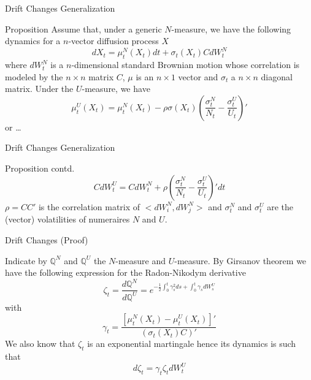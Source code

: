 \documentclass{beamer}
\begin{document}
\begin{frame}{Drift Changes Generalization}
  \begin{block}{Proposition}
    Assume that, under a generic $N$-measure, we have the following dynamics for a $n$-vector diffusion process $X$
    \begin{equation*}
      dX_t = \mu_t^N(X_t)dt + \sigma_t(X_t)CdW^N_t
    \end{equation*}
    where $dW^N_t$ is a $n$-dimensional standard Brownian motion whose correlation is modeled by the $n\times n$ matrix $C$, $\mu$ is an $n\times 1$ vector and $\sigma_t$ a $n\times n$ diagonal matrix. Under the $U$-measure, we have
    \begin{equation}
      \mu^U_t(X_t) = \mu^N_t(X_t) - \rho\sigma(X_t)\left(\frac{\sigma^N_t}{N_t}-\frac{\sigma^U_t}{U_t}\right)'
    \end{equation}
	or \ldots
	\end{block}
\end{frame}

\begin{frame}{Drift Changes Generalization}
	\begin{block}{Proposition contd.}
		\begin{equation}
			CdW^U_t = CdW^N_t + \rho\left(\frac{\sigma^N_t}{N_t}-\frac{\sigma^U_t}{U_t}\right)' dt
		\end{equation}
		$\rho=CC'$ is the correlation matrix of $<dW^N_i,dW^N_j>$ and $\sigma^N_t$ and $\sigma^U_t$ are the (vector) volatilities of numeraires $N$ and $U$. %
	\end{block}
\end{frame}

\begin{frame}{Drift Changes (Proof)}
  
  Indicate by $\mathbb{Q}^N$ and $\mathbb{Q}^U$ the $N$-measure and $U$-measure. By Girsanov theorem we have the following expression for the Radon-Nikodym derivative
  \begin{equation*}
    \zeta_t = \frac{d\mathbb{Q}^N}{d\mathbb{Q}^U} = e^{-\frac{1}{2}\int_0^t\gamma_s^2 ds + \int_0^t\gamma_s dW_s^U}
  \end{equation*}
  with 
  \begin{equation}
    \gamma_t=\frac{[\mu^N_t(X_t)-\mu_t^U(X_t)]'}{(\sigma_t(X_t)C)'}
    \label{eq:gamma_t}
  \end{equation}
	\pause
  We also know that $\zeta_t$ is an exponential martingale hence its dynamics is such that 
  \begin{equation}
    d\zeta_t=\gamma_t\zeta_tdW_t^U
    \label{eq:dzeta1}
  \end{equation}
\end{frame}
\end{document}

